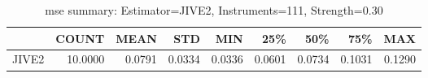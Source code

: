 \begin{table}[ht]
\centering
\caption{mse summary: Estimator=JIVE2, Instruments=111, Strength=0.30}
\begin{tabular}{lrrrrrrrr}
\toprule
 & COUNT & MEAN & STD & MIN & 25\% & 50\% & 75\% & MAX \\
\midrule
JIVE2 & 10.0000 & 0.0791 & 0.0334 & 0.0336 & 0.0601 & 0.0734 & 0.1031 & 0.1290 \\
\bottomrule
\end{tabular}
\end{table}
